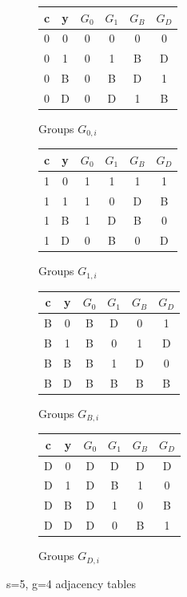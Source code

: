 \documentclass[11pt, oneside]{article} 	%
\begin{document}
\begin{figure}[!htb]
\begin{subfigure}{.25\textwidth}
\begin{tabular}{|| c c || c c c c || } 
 \hline
c & y & $G_0$ & $G_1$ & $G_B$ & $G_D$ \\ [0.5ex] 
 \hline\hline
   0 & 0 & 0 & 0 & 0 & 0 \\
   0 & 1 & 0 & 1 & B & D \\
   0 & B & 0 & B & D & 1 \\
   0 & D & 0 & D & 1 & B \\
 \hline
 \end{tabular}
\caption{Groups $G_{0,i}$}
\label{fig:gf4-0}
\end{subfigure}
\begin{subfigure}{.25\textwidth}
\begin{tabular}{|| c c || c c c c || } 
 \hline
c & y & $G_0$ & $G_1$ & $G_B$ & $G_D$ \\ [0.5ex] 
 \hline\hline
   1 & 0 & 1 & 1 & 1 & 1 \\
   1 & 1 & 1 & 0 & D & B \\
   1 & B & 1 & D & B & 0 \\
   1 & D & 0 & B & 0 & D \\
   \hline
   
   \end{tabular}
\caption{Groups $G_{1,i}$}
\end{subfigure}
\begin{subfigure}{.25\textwidth}
\begin{tabular}{|| c c || c c c c || } 
 \hline
c & y & $G_0$ & $G_1$ & $G_B$ & $G_D$ \\ [0.5ex] 
 \hline\hline
   B & 0 & B & D & 0 & 1 \\
   \cellcolor{green}B & \cellcolor{green}1 & \cellcolor{green} B & \cellcolor{green}0 & \cellcolor{green}1 & \cellcolor{green} D \\
   B & B & B & 1 & D & 0 \\
   B & D & B & B & B & B \\
   \hline
  
   \end{tabular}
\caption{Groups $G_{B,i}$}
\label{fig:gf4-B}
\end{subfigure}
\begin{subfigure}{.25\textwidth}
\begin{tabular}{|| c c || c c c c || } 
 \hline
c & y & $G_0$ & $G_1$ & $G_B$ & $G_D$ \\ [0.5ex] 
 \hline\hline
   D & 0 & D & D & D & D \\
   D & 1 & D & B & 1 & 0 \\
   D & B & D & 1 & 0 & B \\
   D & D & D & 0 & B & 1 \\
   \hline
   
   \end{tabular}
\caption{Groups $G_{D,i}$}
\label{fig:gf4-D}
\end{subfigure}
\caption{s=5, g=4 adjacency tables}
\end{figure}
\end{document}
